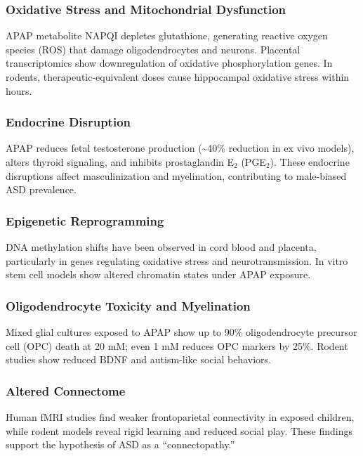 \documentclass[12pt]{article}
\begin{document}
\subsubsection{Oxidative Stress and Mitochondrial Dysfunction}
APAP metabolite NAPQI depletes glutathione, generating reactive oxygen species (ROS) that damage oligodendrocytes and neurons. Placental transcriptomics show downregulation of oxidative phosphorylation genes. In rodents, therapeutic-equivalent doses cause hippocampal oxidative stress within hours.

\subsubsection{Endocrine Disruption}
APAP reduces fetal testosterone production (\textasciitilde40\% reduction in ex vivo models), alters thyroid signaling, and inhibits prostaglandin E$_2$ (PGE$_2$). These endocrine disruptions affect masculinization and myelination, contributing to male-biased ASD prevalence.

\subsubsection{Epigenetic Reprogramming}
DNA methylation shifts have been observed in cord blood and placenta, particularly in genes regulating oxidative stress and neurotransmission. In vitro stem cell models show altered chromatin states under APAP exposure.

\subsubsection{Oligodendrocyte Toxicity and Myelination}
Mixed glial cultures exposed to APAP show up to 90\% oligodendrocyte precursor cell (OPC) death at 20 mM; even 1 mM reduces OPC markers by 25\%. Rodent studies show reduced BDNF and autism-like social behaviors.

\subsubsection{Altered Connectome}
Human fMRI studies find weaker frontoparietal connectivity in exposed children, while rodent models reveal rigid learning and reduced social play. These findings support the hypothesis of ASD as a ``connectopathy.''
\end{document}
